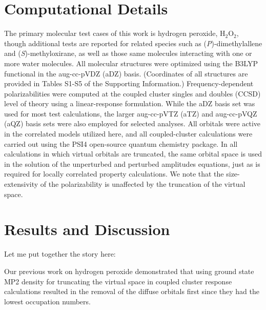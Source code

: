 \documentclass[journal=jpccck,manuscript=article]{achemso}
\begin{document}
\section{Computational Details}

The primary molecular test cases of this work is hydrogen peroxide,
H$_2$O$_2$, though additional tests are reported for related species such as
(\textit{P})-dimethylallene and (\textit{S})-methyloxirane, as well as those
same molecules interacting with one or more water molecules.  All molecular
structures were optimized using the B3LYP
functional\cite{Becke93,Stephens94:B3LYP,Lee88:LYP} in the aug-cc-pVDZ (aDZ)
basis.\cite{Dunning89,Kendall92,Woon94} (Coordinates of all structures are
provided in Tables S1-S5 of the Supporting Information.) Frequency-dependent
polarizabilities were computed at the coupled cluster singles and doubles
(CCSD) level of theory\cite{Purvis82} using a linear-response
formulation.\cite{Christiansen98} While the aDZ basis set was used for most
test calculations, the larger aug-cc-pVTZ (aTZ) and aug-cc-pVQZ (aQZ) basis
sets were also employed for selected analyses.\cite{Kendall92} All orbitals
were active in the correlated models utilized here, and all coupled-cluster
calculations were carried out using the PSI4 open-source quantum chemistry
package.\cite{psi4}  In all calculations in which virtual orbitals are
truncated, the same orbital space is used in the solution of the unperturbed
and perturbed amplitudes equations, just as is required for locally correlated
property calculations.\cite{Crawford10}  We note that the size-extensivity of
the polarizability is unaffected by the truncation of
the virtual space.

\section{Results and Discussion}

Let me put together the story here:

Our previous work on hydrogen peroxide demonstrated that using ground state
MP2 density for truncating the virtual space in coupled cluster response 
calculations resulted in the removal of the diffuse orbitals first since 
they had the lowest occupation numbers.
\end{document}
